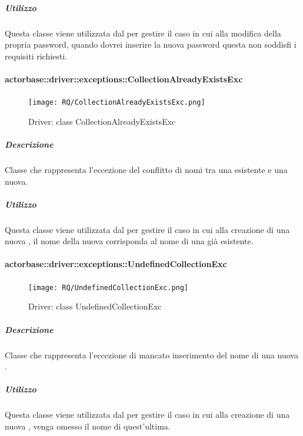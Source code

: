 \documentclass{scalatekids-article}
\begin{document}
\subparagraph{Utilizzo}

Questa classe viene utilizzata dal  per gestire il caso in cui alla modifica della propria password, quando dovrei inserire la nuova password questa non soddisfi i requisiti richiesti.

\paragraph{actorbase::driver::exceptions::CollectionAlreadyExistsExc}

\begin{figure}[H]
  \begin{center}
    \texttt{[image: RQ/CollectionAlreadyExistsExc.png]}
    \caption{Driver: class CollectionAlreadyExistsExc}
  \end{center}
\end{figure}

\subparagraph{Descrizione}

Classe che rappresenta l'eccezione del conflitto di nomi tra una  esistente e una nuova.

\subparagraph{Utilizzo}

Questa classe viene utilizzata dal  per gestire il caso in cui alla creazione di una nuova , il nome della nuova  corrisponda al nome di una  già esistente.

\paragraph{actorbase::driver::exceptions::UndefinedCollectionExc}

\begin{figure}[H]
  \begin{center}
    \texttt{[image: RQ/UndefinedCollectionExc.png]}
    \caption{Driver: class UndefinedCollectionExc}
  \end{center}
\end{figure}

\subparagraph{Descrizione}

Classe che rappresenta l'eccezione di mancato inserimento del nome di una nuova .

\subparagraph{Utilizzo}

Questa classe viene utilizzata dal  per gestire il caso in cui alla creazione di una nuova , venga omesso il nome di quest'ultima.
\end{document}
